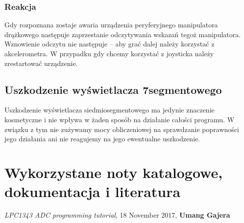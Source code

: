 \documentclass[a4paper,12pt,twoside]{article}
\theoremstyle{plain}
\theoremstyle{definition}
\theoremstyle{remark}
\begin{document}
	\subsubsection{Reakcja}
	Gdy rozpoznana zostaje awaria urządzenia peryferyjnego manipulatora drążkowego następuje zaprzestanie odczytywania wskazań tegoż manipulatora. Wznowienie odczytu nie następuje -- aby grać dalej należy korzystać z akcelerometra. W przypadku gdy chcemy korzystać z joysticka należy zrestartować urządzenie.
	
	\subsection{Uszkodzenie wyświetlacza 7segmentowego}
	Uszkodzenie wyświetlacza siedmiosegmentowego ma jedynie znaczenie kosmetyczne i nie wpływa w żaden sposób na działanie całości programu. W związku z tym nie zużywamy mocy obliczeniowej na sprawdzanie poprawności jego działania ani nie reagujemy na jego ewentualne uszkodzenie.
\section{Wykorzystane noty katalogowe, dokumentacja i literatura}
		
		
\begin{thebibliography}{abcd}
\textit{LPC1343 ADC programming tutorial},
	{18 November 2017},
	\textbf{Umang Gajera}
	
\end{thebibliography}
\end{document}
